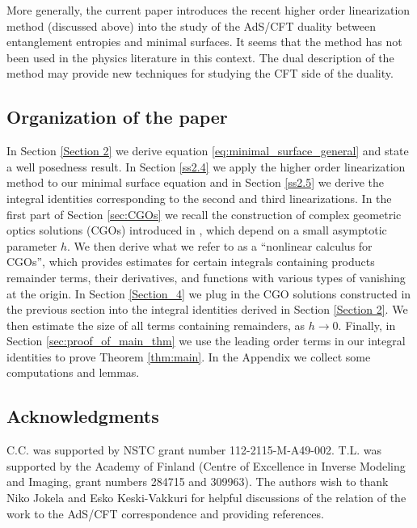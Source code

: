 \documentclass[12pt]{amsart}
\theoremstyle{definition}
\theoremstyle{remark}
\begin{document}
More generally, the current paper introduces the recent higher order linearization method (discussed above) into the study of the AdS/CFT duality between entanglement entropies and minimal surfaces. %
It seems that the method has not been used in the physics literature in this context. The dual description of the method may provide new techniques for studying the CFT side of the duality.

\subsection{Organization of the paper}

In Section \ref{Section 2} we derive equation \eqref{eq:minimal_surface_general} and state a well posedness result. In Section \ref{ss2.4} we apply the higher order linearization method to our minimal surface equation and in Section \ref{ss2.5} we derive the integral identities corresponding to the second and third linearizations. In the first part of Section \ref{sec:CGOs} we recall the construction of complex geometric optics solutions (CGOs) introduced in \cite{guillarmou2011identification}, which depend on a small asymptotic parameter $h$. We then derive what we refer to as a ``nonlinear calculus for CGOs'', which provides estimates for certain integrals containing products remainder terms, their derivatives, and  functions with various types of vanishing at the origin. In Section \ref{Section_4} we plug in the CGO solutions constructed in the previous section into the integral identities derived in Section \ref{Section 2}. We then estimate the size of all terms containing remainders, as $h\to0$. Finally, in Section \ref{sec:proof_of_main_thm} we use the leading order terms in our integral identities to prove Theorem \ref{thm:main}. In the Appendix we collect some computations and lemmas. %

\subsection{Acknowledgments}
C.C. was supported by NSTC grant number 112-2115-M-A49-002. T.L. was supported by the Academy of Finland (Centre of Excellence in Inverse Modeling and Imaging, grant numbers 284715 and 309963).
The authors wish to thank Niko Jokela and Esko Keski-Vakkuri for helpful discussions of the relation of the work to the AdS/CFT correspondence and providing references. 
\end{document}
